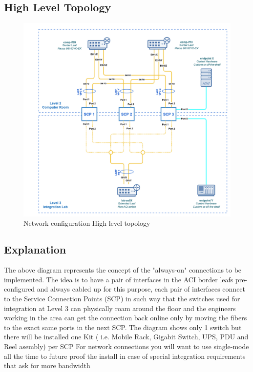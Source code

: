   \subsection{High Level Topology}
  \begin{figure}
    \includegraphics[width=14cm]{images/image-002.png}
    \centering
    \caption{Network configuration High level topology}
  \end{figure}

  \newpage
  \subsection{Explanation}
    The above diagram represents the concept of the "always-on" connections to be implemented. 
    The idea is to have a pair of interfaces in the ACI border leafs pre-configured and always cabled up for this purpose, each pair of interfaces connect to the Service Connection Points (SCP) in such way that the switches used for integration at Level 3 can physically roam around the floor and the engineers working in the area can get the connection back online only by moving the fibers to the exact same ports in the next SCP. 
    The diagram shows only 1 switch but there will be installed one Kit ( i.e. Mobile Rack, Gigabit Switch, UPS, PDU and Reel asembly) per SCP
    For network connections you will want to use single-mode all the time to future proof the install in case of special integration requirements that ask for more bandwidth


